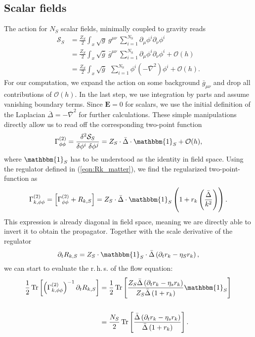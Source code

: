 \subsection{Scalar fields}
The action for $N_S$ scalar fields, minimally coupled to gravity reads
\begin{align}
	\mathcal{S}_S &= \frac{Z_{S}}{2}\int_x \sqrt{g} \ g^{\mu\nu} \ \sum\limits_{i=1}^{N_{\text{S}}} \partial_{\mu}\phi^{i}\partial_{\nu}\phi^{i} \nonumber \\
&=  \frac{Z_{S}}{2}\int_x \sqrt{\bar{g}} \ \bar{g}^{\mu\nu} \ \sum\limits_{i=1}^{N_{\text{S}}} \partial_{\mu}\phi^{i}\partial_{\nu}\phi^{i} + \mathcal{O}(h) \\
&= \frac{Z_{S}}{2}\int_x \sqrt{\bar{g}} \ \ \sum\limits_{i=1}^{N_{\text{S}}} \phi^{i}\left(-\bar{\nabla}^2\right)\phi^{i} + \mathcal{O}(h). \nonumber
\end{align}
For our computation, we expand the action on some background $\bar{g}_{\mu\nu}$ and drop all contributions of $\mathcal{O}(h)$. In the last step, we use integration by parts and assume vanishing boundary terms. Since $\mathbf{E} =0$ for scalars, we use the initial definition of the Laplacian $\bar{\Delta} = -\bar{\nabla}^2$ for further calculations. These simple manipulations directly allow us to read off the corresponding two-point function
\begin{align}
	\Gamma^{(2)}_{\phi\phi} = \frac{\delta^2 \mathcal{S}_S}{\delta\phi^{i}\ \delta\phi^{j}} = Z_S \cdot\bar{\Delta}\cdot\mathbbm{1}_S + \mathcal{O}(h),
\end{align}
where $\mathbbm{1}_S$ has to be understood as the identity in field space. Using the regulator defined in (\ref{eqn:Rk_matter}), we find the regularized two-point-function as
\begin{align}
	\Gamma^{(2)}_{k, \phi\phi} = \left[\Gamma^{(2)}_{\phi\phi}+ R_{k, S}\right]  = Z_S \cdot\bar{\Delta}\cdot\mathbbm{1}_S\left(1 + r_k\left(\frac{\bar{\Delta}}{k^2}\right)\right).
\end{align}
This expression is already diagonal in field space, meaning we are directly able to invert it to obtain the propagator. Together with the scale derivative of the regulator
\begin{align}
	\partial_t R_{k, S} = Z_S\cdot\mathbbm{1}_S\cdot\bar{\Delta}\left(\partial_t r_k - \eta_S r_k\right),
\end{align}
we can start to evaluate the r.\,h.\,s. of the flow equation:
\begin{align}
	\frac{1}{2}\tr{\left(\Gamma^{(2)}_{k, \phi\phi}\right)^{-1}\partial_t R_{k,S}} &= \frac{1}{2}\tr{\frac{Z_S\bar{\Delta}\left(\partial_t r_k - \eta_s r_k\right)}{Z_S \bar{\Delta}\left(1 + r_k\right)}\mathbbm{1}_S} \nonumber\\
	\phantom{.} \\
	&=   \frac{N_S}{2}\tr{\frac{\bar{\Delta}\left(\partial_t r_k - \eta_s r_k\right)}{\bar{\Delta}\left(1 + r_k\right)}}. \nonumber
\end{align}
